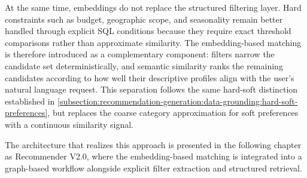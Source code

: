 At the same time, embeddings do not replace the structured filtering layer. Hard constraints such as budget, geographic scope, and seasonality remain better handled through explicit SQL conditions because they require exact threshold comparisons rather than approximate similarity. The embedding-based matching is therefore introduced as a complementary component: filters narrow the candidate set deterministically, and semantic similarity ranks the remaining candidates according to how well their descriptive profiles align with the user's natural language request. This separation follows the same hard-soft distinction established in \autoref{subsection:recommendation-generation:data-grounding:hard-soft-preferences}, but replaces the coarse category approximation for soft preferences with a continuous similarity signal.

The architecture that realizes this approach is presented in the following chapter as Recommender V2.0, where the embedding-based matching is integrated into a graph-based workflow alongside explicit filter extraction and structured retrieval.
